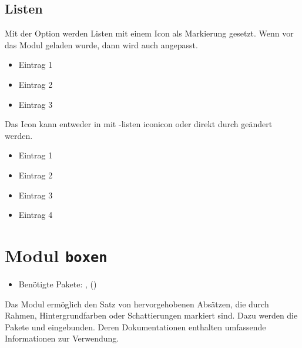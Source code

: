 \subsection{Listen}\label{subsec:icons-listen}

Mit der Option  werden  Listen
mit einem Icon als Markierung gesetzt. Wenn vor  das Modul
 geladen wurde, dann wird auch  angepasst.

\begin{example}
	\begin{itemize}
		\item Eintrag 1
		\item Eintrag 2
		\item Eintrag 3
	\end{itemize}
\end{example}

Das Icon kann entweder in  mit \key*-{listen icon}{icon} oder
direkt durch  geändert werden.

\begin{example}
	\begin{itemize}
		\item Eintrag 1
		\item Eintrag 2
		\renewcommand{\iconListItem}{%
			\textcolor{secondary}{\faHandPointRight[regular]}%
		}
		\item Eintrag 3
		\item Eintrag 4
	\end{itemize}
\end{example}

\section{Modul \texttt{boxen}}\label{subsec:icons-boxen}
\begin{itemize}
	\item Benötigte Pakete: ,  ()
\end{itemize}

Das Modul  ermöglich den Satz von hervorgehobenen Absätzen, die
durch Rahmen, Hintergrundfarben oder Schattierungen markiert sind. Dazu werden
die Pakete  und  eingebunden. Deren Dokumentationen
enthalten umfassende Informationen zur Verwendung.

